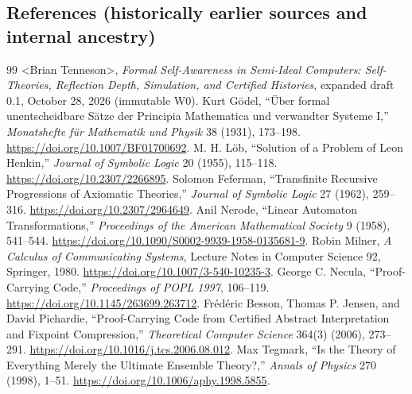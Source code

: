 \documentclass[11pt,letterpaper]{article}
\begin{document}
\subsection*{References (historically earlier sources and internal ancestry)}
\begin{thebibliography}{99}
\small
{} \textless Brian Tenneson\textgreater, \emph{Formal Self-Awareness in Semi-Ideal Computers: Self-Theories, Reflection Depth, Simulation, and Certified Histories}, expanded draft 0.1, October 28, 2026 (immutable W0).
 Kurt G{\"o}del, ``{\"U}ber formal unentscheidbare S{\"a}tze der Principia Mathematica und verwandter Systeme I,'' \emph{Monatshefte f{\"u}r Mathematik und Physik} 38 (1931), 173--198. \url{https://doi.org/10.1007/BF01700692}.
 M. H. L{\"o}b, ``Solution of a Problem of Leon Henkin,'' \emph{Journal of Symbolic Logic} 20 (1955), 115--118. \url{https://doi.org/10.2307/2266895}.
 Solomon Feferman, ``Transfinite Recursive Progressions of Axiomatic Theories,'' \emph{Journal of Symbolic Logic} 27 (1962), 259--316. \url{https://doi.org/10.2307/2964649}.
 Anil Nerode, ``Linear Automaton Transformations,'' \emph{Proceedings of the American Mathematical Society} 9 (1958), 541--544. \url{https://doi.org/10.1090/S0002-9939-1958-0135681-9}.
 Robin Milner, \emph{A Calculus of Communicating Systems}, Lecture Notes in Computer Science 92, Springer, 1980. \url{https://doi.org/10.1007/3-540-10235-3}.
 George C. Necula, ``Proof-Carrying Code,'' \emph{Proceedings of POPL 1997}, 106--119. \url{https://doi.org/10.1145/263699.263712}.
 Fr\'{e}d\'{e}ric Besson, Thomas P. Jensen, and David Pichardie, ``Proof-Carrying Code from Certified Abstract Interpretation and Fixpoint Compression,'' \emph{Theoretical Computer Science} 364(3) (2006), 273--291. \url{https://doi.org/10.1016/j.tcs.2006.08.012}.
 Max Tegmark, ``Is the Theory of Everything Merely the Ultimate Ensemble Theory?,'' \emph{Annals of Physics} 270 (1998), 1--51. \url{https://doi.org/10.1006/aphy.1998.5855}.
\end{thebibliography}
\clearpage
\end{document}
